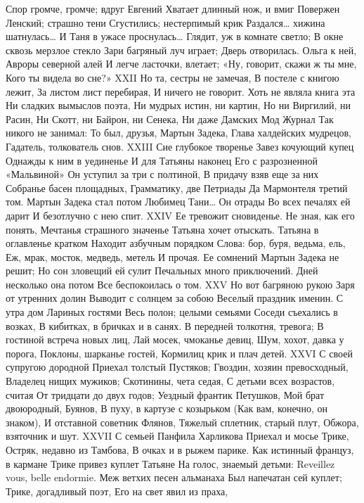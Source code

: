 Спор громче, громче; вдруг Евгений
Хватает длинный нож, и вмиг
Повержен Ленский; страшно тени
Сгустились; нестерпимый крик
Раздался… хижина шатнулась…
И Таня в ужасе проснулась…
Глядит, уж в комнате светло;
В окне сквозь мерзлое стекло
Зари багряный луч играет;
Дверь отворилась. Ольга к ней,
Авроры северной алей
И легче ласточки, влетает;
«Ну, говорит, скажи ж ты мне,
Кого ты видела во сне?»
XXII
Но та, сестры не замечая,
В постеле с книгою лежит,
За листом лист перебирая,
И ничего не говорит.
Хоть не являла книга эта
Ни сладких вымыслов поэта,
Ни мудрых истин, ни картин,
Но ни Виргилий, ни Расин,
Ни Скотт, ни Байрон, ни Сенека,
Ни даже Дамских Мод Журнал
Так никого не занимал:
То был, друзья, Мартын Задека,
Глава халдейских мудрецов,
Гадатель, толкователь снов.
XXIII
Сие глубокое творенье
Завез кочующий купец
Однажды к ним в уединенье
И для Татьяны наконец
Его с разрозненной «Мальвиной»
Он уступил за три с полтиной,
В придачу взяв еще за них
Собранье басен площадных,
Грамматику, две Петриады
Да Мармонтеля третий том.
Мартын Задека стал потом
Любимец Тани… Он отрады
Во всех печалях ей дарит
И безотлучно с нею спит.
XXIV
Ее тревожит сновиденье.
Не зная, как его понять,
Мечтанья страшного значенье
Татьяна хочет отыскать.
Татьяна в оглавленье кратком
Находит азбучным порядком
Слова: бор, буря, ведьма, ель,
Еж, мрак, мосток, медведь, метель
И прочая. Ее сомнений
Мартын Задека не решит;
Но сон зловещий ей сулит
Печальных много приключений.
Дней несколько она потом
Все беспокоилась о том.
XXV
Но вот багряною рукою
Заря от утренних долин
Выводит с солнцем за собою
Веселый праздник именин.
С утра дом Лариных гостями
Весь полон; целыми семьями
Соседи съехались в возках,
В кибитках, в бричках и в санях.
В передней толкотня, тревога;
В гостиной встреча новых лиц,
Лай мосек, чмоканье девиц,
Шум, хохот, давка у порога,
Поклоны, шарканье гостей,
Кормилиц крик и плач детей.
XXVI
С своей супругою дородной
Приехал толстый Пустяков;
Гвоздин, хозяин превосходный,
Владелец нищих мужиков;
Скотинины, чета седая,
С детьми всех возрастов, считая
От тридцати до двух годов;
Уездный франтик Петушков,
Мой брат двоюродный, Буянов,
В пуху, в картузе с козырьком
(Как вам, конечно, он знаком),
И отставной советник Флянов,
Тяжелый сплетник, старый плут,
Обжора, взяточник и шут.
XXVII
С семьей Панфила Харликова
Приехал и мосье Трике,
Остряк, недавно из Тамбова,
В очках и в рыжем парике.
Как истинный француз, в кармане
Трике привез куплет Татьяне
На голос, знаемый детьми:
Reveillez vous, belle endormie.
Меж ветхих песен альманаха
Был напечатан сей куплет;
Трике, догадливый поэт,
Его на свет явил из праха,
